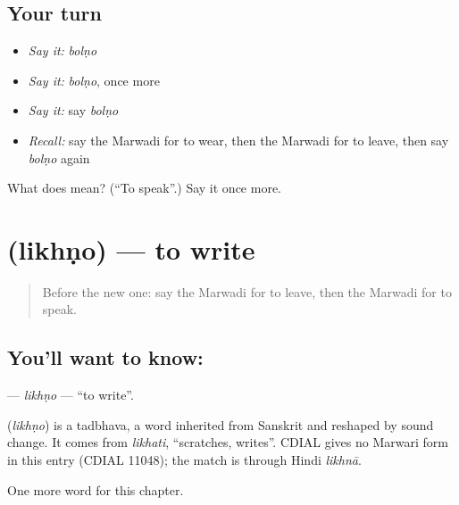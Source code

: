 \subsection*{Your turn}
\begin{itemize}
\raggedright
  \item \emph{Say it:} \emph{bolṇo}
  \item \emph{Say it:} \emph{bolṇo}, once more
  \item \emph{Say it:} say \emph{bolṇo}
  \item \emph{Recall:} say the Marwadi for to wear, then the Marwadi for to leave, then say \emph{bolṇo} again
\end{itemize}

\begin{tcolorbox}[breakable,colback=teal!4,colframe=teal!35!black,title={Before you move on}]
What does  mean? (\textquotedblleft{}To speak\textquotedblright{}.) Say it once more.
\end{tcolorbox}
\section[\texorpdfstring{\mw{लिखणो} (likhṇo)}{लिखणो (likhṇo)}]{ (likhṇo) — to write}

\label{lesson:MW-C57-likhno}



\begin{quote}
Before the new one: say the Marwadi for to leave, then the Marwadi for to speak.
\end{quote}

\subsection*{You'll want to know: }
\textbf{} — \emph{likhṇo} — \textquotedblleft{}to write\textquotedblright{}.

\begin{cousinweb}
\textbf{} (\emph{likhṇo}) is a tadbhava, a word inherited from Sanskrit and reshaped by sound change. It comes from \emph{likhati}, \textquotedblleft{}scratches, writes\textquotedblright{}. CDIAL gives no Marwari form in this entry (CDIAL 11048); the match is through Hindi \emph{likhnā}.
\end{cousinweb}

\begin{grammarlens}[title={What you've built}]
One more word for this chapter.
\end{grammarlens}

